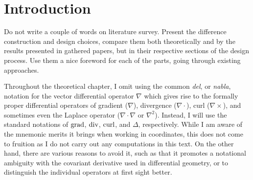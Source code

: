 \documentclass[11pt,a4paper,twoside,openany]{report}
\begin{document}

\begin{titlepage}
    
\end{titlepage}

\newpage\blankpage




% 

% 

% 


\tableofcontents

\chapter*{Introduction}
\label{chap:introduction}

Do not write a couple of words on literature survey. Present the difference construction and design choices, compare them both theoretically and by the results presented in gathered papers, but in their respective sections of the design process. Use them a nice foreword for each of the parts, going through existing approaches.

\lipsum[1]

Throughout the theoretical chapter, I omit using the common \emph{del}, or \emph{nabla}, notation for the vector differential operator $\nabla$ which gives rise to the formally proper differential operators of gradient ($\nabla$), divergence ($\nabla\cdot$), curl ($\nabla\times$), and sometimes even the Laplace operator ($\nabla\cdot\nabla$ or $\nabla^2$). Instead, I will use the standard notations of $\operatorname{grad}$, $\operatorname{div}$, $\operatorname{curl}$, and $\Delta$, respectively. While I am aware of the mnemonic merits it brings when working in coordinates, this does not come to fruition as I do not carry out any computations in this text. On the other hand, there are various reasons to avoid it, such as that it promotes a notational ambiguity with the covariant derivative used in differential geometry, or to distinguish the individual operators at first sight better.
%
%
%
%
\end{document}
